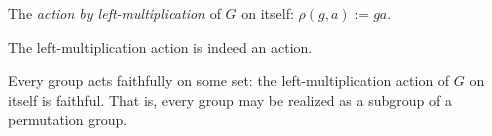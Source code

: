 \begin{definition}
  \label{def:groups:left-mult-action}
  \leanok
  The \emph{action by left-multiplication} of $G$ on itself:
  $\rho(g,a) := ga$.
\end{definition}

\begin{proposition}
  \label{prop:groups:isAction-leftMulAction}
  The left-multiplication action is indeed an action.
\end{proposition}

\begin{theorem}
  \label{thm:groups:cayleys-theorem}
  Every group acts faithfully on some set: the left-multiplication
  action of $G$ on itself is faithful. That is, every group may be
  realized as a subgroup of a permutation group.
\end{theorem}
